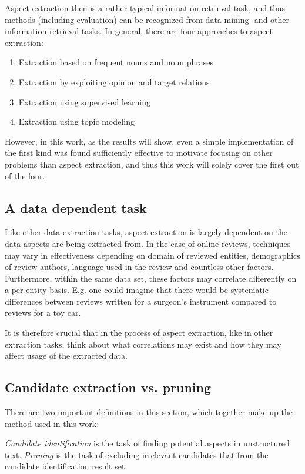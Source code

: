 \documentclass[a4paper,11pt]{kth-mag}
\begin{document}
Aspect extraction then is a rather typical information retrieval task, and thus methods (including evaluation) can be recognized from data mining- and other information retrieval tasks. In general, there are four approaches to aspect extraction\cite[chapter 5.3]{liu2012sentiment}:

\begin{enumerate}
\item Extraction based on frequent nouns and noun phrases
\item Extraction by exploiting opinion and target relations
\item Extraction using supervised learning
\item Extraction using topic modeling
\end{enumerate}
However, in this work, as the results will show, even a simple implementation of the first kind was found sufficiently effective to motivate focusing on other problems than aspect extraction, and thus this work will solely cover the first out of the four.

\subsection{A data dependent task}
Like other data extraction tasks, aspect extraction is largely dependent on the data aspects are being extracted from.
In the case of online reviews, techniques may vary in effectiveness depending on domain of reviewed entities, demographics of review authors, language used in the review and countless other factors. Furthermore, within the same data set, these factors may correlate differently on a per-entity basis. E.g. one could imagine that there would be systematic differences between reviews written for a surgeon's instrument compared to reviews for a toy car.

It is therefore crucial that in the process of aspect extraction, like in other extraction tasks, think about what correlations may exist and how they may affect usage of the extracted data.

\subsection{Candidate extraction vs. pruning}
There are two important definitions in this section, which together make up the method used in this work:

\emph{Candidate identification} is the task of finding potential aspects in unstructured text. \emph{Pruning} is the task of excluding irrelevant candidates that from the candidate identification result set.
\end{document}
